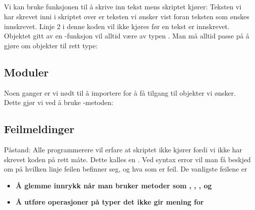 \subsection{}
Vi kan bruke funksjonen  til å skrive inn tekst mens skriptet kjører:
Teksten vi har skrevet inni  i skriptet over er teksten vi ønsker vist foran teksten som ønskes innskrevet. Linje 2 i denne koden vil ikke kjøres før en tekst er innskrevet.
\newpage
Objektet gitt av en -funksjon vil alltid være av typen . Man må alltid passe på å gjøre om objekter til rett type:
\subsection{Moduler}
Noen ganger er vi nødt til å importere  for å få tilgang til objekter vi ønsker. Dette gjør vi ved å bruke -metoden:

\newpage
\subsection{Feilmeldinger}
Påstand: Alle programmerere vil erfare at skriptet ikke kjører fordi vi ikke har skrevet koden på rett måte. Dette kalles en . Ved syntax error vil man få beskjed om på hvilken linje feilen befinner seg, og hva som er feil. De vanligste feilene er
\begin{itemize}
\item \textbf{Å glemme innrykk når man bruker metoder som , , , og  }
\newpage
\item \textbf{Å utføre operasjoner på typer det ikke gir mening for}
\end{itemize}

\newpage



